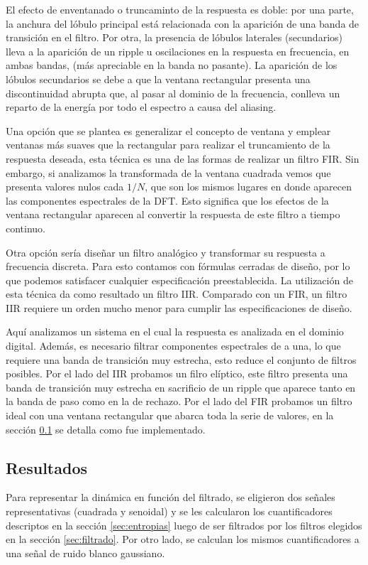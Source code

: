 El efecto de enventanado o truncaminto de la respuesta es doble: por una parte, la anchura del lóbulo principal está relacionada con la aparición de una banda de transición en el filtro. Por otra, la presencia de lóbulos laterales (secundarios) lleva a la aparición de un ripple u oscilaciones en la respuesta en frecuencia, en ambas bandas, (más apreciable en la banda no pasante).
La aparición de los lóbulos secundarios se debe a que la ventana rectangular presenta una discontinuidad abrupta que, al pasar al dominio de la frecuencia, conlleva un reparto de la energía por todo el espectro a causa del aliasing.

Una opción que se plantea es generalizar el concepto de ventana y emplear ventanas más suaves que la rectangular para realizar el truncamiento de la respuesta deseada, esta técnica es una de las formas de realizar un filtro FIR.
Sin embargo, si analizamos la transformada de la ventana cuadrada vemos que presenta valores nulos cada $1/N$, que son los mismos lugares en donde aparecen las componentes espectrales de la DFT. Esto significa que los efectos de la ventana rectangular aparecen al convertir la respuesta de este filtro a tiempo continuo.

Otra opción sería diseñar un filtro analógico y transformar su respuesta a frecuencia discreta. Para esto contamos con fórmulas cerradas de diseño, por lo que podemos satisfacer cualquier especificación preestablecida. La utilización de esta técnica da como resultado un filtro IIR. Comparado con un FIR, un filtro IIR requiere un orden mucho menor para cumplir las especificaciones de diseño.

Aquí analizamos un sistema en el cual la respuesta es analizada en el dominio digital. Además, es necesario filtrar componentes espectrales de a una, lo que requiere una banda de transición muy estrecha, esto reduce el conjunto de filtros posibles. Por el lado del IIR probamos un filro elíptico, este filtro presenta una banda de transición muy estrecha en sacrificio de un ripple que aparece tanto en la banda de paso como en la de rechazo. Por el lado del FIR probamos un filtro ideal con una ventana rectangular que abarca toda la serie de valores, en la sección \ref{sec:resultados} se detalla como fue implementado.

\subsection{Resultados}
\label{sec:resultados}

Para representar la dinámica en función del filtrado, se eligieron dos señales representativas (cuadrada y senoidal) y se les calcularon los cuantificadores descriptos en la sección \ref{sec:entropias} luego de ser filtrados por los filtros elegidos en la sección \ref{sec:filtrado}. Por otro lado, se calculan los mismos cuantificadores a una señal de ruido blanco gaussiano.


